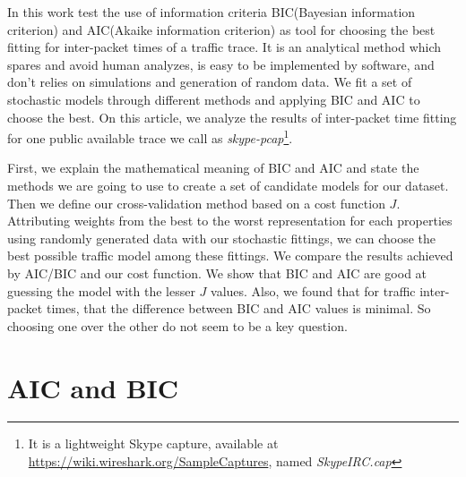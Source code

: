 In this work test the use of information criteria BIC(Bayesian information criterion) and AIC(Akaike information criterion) as tool for choosing the best fitting for inter-packet times of a traffic trace. It is an analytical method which spares and avoid human analyzes, is easy to be implemented by software, and don't relies on simulations and generation of random data. We fit a set of stochastic models through different methods and applying BIC and AIC to choose the best.  On this article, we analyze the results of inter-packet time fitting for one public available trace we call as \textit{skype-pcap}\footnote{It is a lightweight Skype capture, available at \href{https://wiki.wireshark.org/SampleCaptures}{https://wiki.wireshark.org/SampleCaptures}, named \textit{SkypeIRC.cap} }.


First, we explain the mathematical meaning of BIC and AIC and state the methods we are going to use to create a set of candidate models for our dataset. Then we define our cross-validation method based on a cost function $J$. Attributing weights from the best to the worst representation for each properties using randomly generated data with our stochastic fittings, we can choose the best possible traffic model among these fittings. We compare the results achieved by AIC/BIC and our cost function. We show that BIC and AIC are good at guessing the model with the lesser $J$ values. Also, we found that for traffic inter-packet times, that the difference between BIC and AIC values is minimal. So choosing one over the other do not seem to be a key question.  


\section{AIC and BIC}\label{sec:aic-bic}


